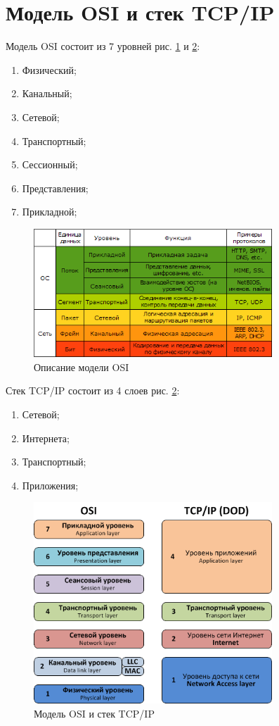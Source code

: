 \section{Модель OSI и стек TCP/IP}

Модель OSI состоит из 7 уровней рис. \ref{fig1} и \ref{fig2}:
\begin{enumerate}
\item Физический;
\item Канальный;
\item Сетевой;
\item Транспортный;
\item Сессионный;
\item Представления;
\item Прикладной;
\end{enumerate}

\begin{figure}[h!]
\centering
\includegraphics[width=0.8\textwidth]{img/exampleosi.png}
\caption{Описание модели OSI}
\label{fig1}
\end{figure}

Стек TCP/IP состоит из 4 слоев рис. \ref{fig2}:
\begin{enumerate}
\item Сетевой;
\item Интернета;
\item Транспортный;
\item Приложения;
\end{enumerate}

\begin{figure}[h!]
\centering
\includegraphics[width=0.8\textwidth]{img/ositcp.png}
\caption{Модель OSI и стек TCP/IP}
\label{fig2}
\end{figure}

